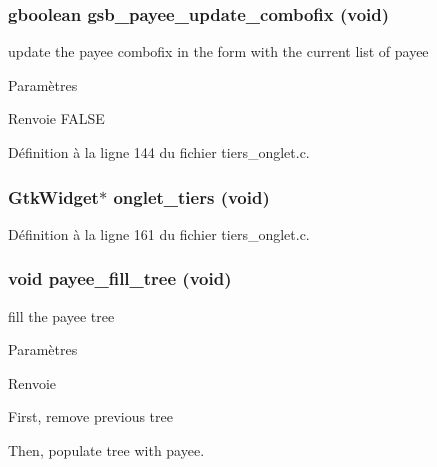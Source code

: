 \subsubsection[{gsb\_\-payee\_\-update\_\-combofix}]{\setlength{\rightskip}{0pt plus 5cm}gboolean gsb\_\-payee\_\-update\_\-combofix (void)}\label{tiers__onglet_8h_a83502a3974423bccf9982335c494e683}
update the payee combofix in the form with the current list of payee


\begin{DoxyParams}{Paramètres}
\item[{\em }]\end{DoxyParams}
\begin{DoxyReturn}{Renvoie}
FALSE 
\end{DoxyReturn}


Définition à la ligne 144 du fichier tiers\_\-onglet.c.

\subsubsection[{onglet\_\-tiers}]{\setlength{\rightskip}{0pt plus 5cm}GtkWidget$\ast$ onglet\_\-tiers (void)}\label{tiers__onglet_8h_accd2776091bc5768c5d272ea591eb393}


Définition à la ligne 161 du fichier tiers\_\-onglet.c.

\subsubsection[{payee\_\-fill\_\-tree}]{\setlength{\rightskip}{0pt plus 5cm}void payee\_\-fill\_\-tree (void)}\label{tiers__onglet_8h_a3526c82a23ba142e443ce5c5282facf8}
fill the payee tree


\begin{DoxyParams}{Paramètres}
\item[{\em }]\end{DoxyParams}
\begin{DoxyReturn}{Renvoie}

\end{DoxyReturn}


First, remove previous tree

Then, populate tree with payee. 



